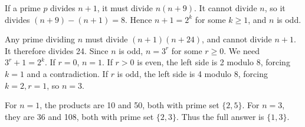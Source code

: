 If a prime $p$ divides $n+1$, it must divide $n(n+9)$. It cannot divide $n$, so it divides $(n+9)-(n+1)=8$. Hence $n+1=2^k$ for some $k\ge1$, and $n$ is odd.

Any prime dividing $n$ must divide $(n+1)(n+24)$, and cannot divide $n+1$. It therefore divides 24. Since $n$ is odd, $n=3^r$ for some $r\ge0$. We need $3^r+1=2^k$. If $r=0$, $n=1$. If $r>0$ is even, the left side is 2 modulo 8, forcing $k=1$ and a contradiction. If $r$ is odd, the left side is 4 modulo 8, forcing $k=2,r=1$, so $n=3$.

For $n=1$, the products are 10 and 50, both with prime set $\{2,5\}$. For $n=3$, they are 36 and 108, both with prime set $\{2,3\}$. Thus the full answer is $\boxed{\{1,3\}}$.
